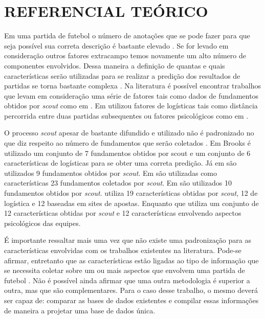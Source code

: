 \section{REFERENCIAL TEÓRICO}
Em uma partida de futebol o número de anotações que se pode fazer para que seja possível sua correta descrição é bastante elevado \cite{Constantinou2013}. Se for levado em consideração outros fatores extracampo temos novamente um alto número de componentes envolvidos. Dessa maneira a definição de quantas e quais características serão utilizadas para se realizar a predição dos resultados de partidas se torna bastante complexa \cite{Tax2015}. Na literatura é possível encontrar trabalhos que levam em consideração uma série de fatores tais como dados de fundamentos obtidos por \textit{scout} como em . Em  utilizou fatores de logísticas tais como distância percorrida entre duas partidas subsequentes \cite{Tax2015} ou fatores psicológicos como em .

O processo \textit{scout} apesar de bastante difundido e utilizado não é padronizado no que diz respeito ao número de fundamentos que serão coletados \cite{Pendharkar2000}. Em Brooks \cite{Brooks2016} é utilizado um conjunto de 7 fundamentos obtidos por scout e um conjunto de 6 características de logísticas para se obter uma correta predição. Já em  são utilizados 9 fundamentos obtidos por \textit{scout}. Em  são utilizadas como características 23 fundamentos coletados por \textit{scout}. Em  são utilizados 10 fundamentos obtidos por \textit{scout}.  utiliza 19 características obtidas por \textit{scout}, 12 de logística e 12 baseadas em sites de apostas. Enquanto que  utiliza um conjunto de 12 características obtidas por \textit{scout} e 12 características envolvendo aspectos psicológicos das equipes. 
 
É importante ressaltar mais uma vez que não existe uma padronização para as características envolvidas com os trabalhos existentes na literatura. Pode-se afirmar, entretanto que as características estão ligadas ao tipo de informação que se necessita coletar sobre um ou mais aspectos que envolvem uma partida de futebol \cite{Tax2015}. Não é possível ainda afirmar que uma outra metodologia é superior a outra, mas que são complementares. Para o caso desse trabalho, o mesmo deverá ser capaz de: comparar as bases de dados existentes e compilar essas informações de maneira a projetar uma base de dados única.